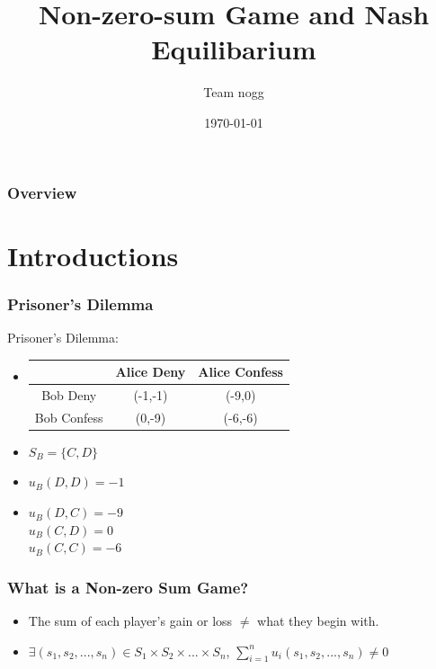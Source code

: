 \documentclass{beamer}
\title[Short title]{Non-zero-sum Game and Nash Equilibarium}
\author{Team nogg}
\institute[SJTU]
{

}
\date{\today}
\begin{document}
\begin{frame}
\titlepage
\end{frame}

\begin{frame}
\frametitle{Overview}
\tableofcontents
\end{frame}

\section{Introductions}


\begin{frame}
\frametitle{Prisoner's Dilemma}
Prisoner's Dilemma:\\
\begin{itemize}[<+->]
\item
\begin{tabular}{|c|c|c|}
\hline
\hline
    &{\color{red}Alice} Deny&{\color{red}Alice} Confess\\
\hline
{\color{blue}Bob} Deny& ({\color{blue}-1},{\color{red}-1}) & ({\color{blue}-9},{\color{red}0})\\
\hline
{\color{blue}Bob} Confess& ({\color{blue}0},{\color{red}-9}) & ({\color{blue}-6},{\color{red}-6})\\
\hline
\hline
\end{tabular}
\item
{\color{blue}$S_B = \{ C, D\}$}  
\item
{\color{blue}$u_B(D,D) = -1$} 
\item
{\color{blue}$u_B(D,C) = -9$} \\
{\color{blue}$u_B(C,D) = 0 $} \text{ } \\
{\color{blue}$u_B(C,C) = -6$} 
\end{itemize}
\end{frame}

\begin{frame}
\frametitle{What is a Non-zero Sum Game?}
\begin{itemize}
\item
The sum of each player's gain or loss $\neq$ what they begin with.
\item
$\exists (s_1,s_2,...,s_n)\in S_1\times S_2 \times ... \times S_n$, $\sum_{i=1}^{n} u_i(s_1,s_2,...,s_n) \neq 0$
\end{itemize}
\end{frame}
\end{document}

